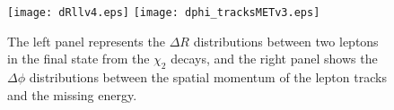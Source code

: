 \documentclass[preprint, superscriptaddress,amsmath, nofootinbib]{revtex4-1}
\begin{document}


\begin{figure}[htbp]
\centering
\texttt{[image: dRllv4.eps]}
\texttt{[image: dphi\_tracksMETv3.eps]}
\caption{
The left panel represents the $\Delta R$ distributions between two leptons in the final state from the $\chi_2$ decays, and the right panel shows the $\Delta \phi$ distributions between the spatial momentum of the lepton tracks and the missing energy. }
\label{fig:4}
\end{figure}
\end{document}
